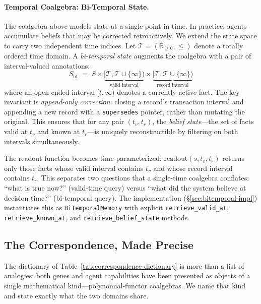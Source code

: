 \paragraph{Temporal Coalgebra: Bi-Temporal State.}
The coalgebra above models state at a single point in time. In practice, agents accumulate beliefs that may be corrected retroactively. We extend the state space to carry two independent time indices. Let $\mathcal{T} = (\mathbb{R}_{\geq 0}, \leq)$ denote a totally ordered time domain. A \emph{bi-temporal state} augments the coalgebra with a pair of interval-valued annotations:
\begin{equation}
S_{\mathrm{bt}} \;=\; S \times \underbrace{[\mathcal{T}, \mathcal{T} \cup \{\infty\})}_{\text{valid interval}} \times \underbrace{[\mathcal{T}, \mathcal{T} \cup \{\infty\})}_{\text{record interval}}
\label{eq:bitemporal-state}
\end{equation}
where an open-ended interval $[t, \infty)$ denotes a currently active fact. The key invariant is \emph{append-only correction}: closing a record's transaction interval and appending a new record with a \texttt{supersedes} pointer, rather than mutating the original. This ensures that for any pair $(t_v, t_r)$, the \emph{belief state}---the set of facts valid at $t_v$ and known at $t_r$---is uniquely reconstructible by filtering on both intervals simultaneously.

The readout function becomes time-parameterized: $\mathrm{readout}(s, t_v, t_r)$ returns only those facts whose valid interval contains $t_v$ and whose record interval contains $t_r$. This separates two questions that a single-time coalgebra conflates: ``what is true now?'' (valid-time query) versus ``what did the system believe at decision time?'' (bi-temporal query). The implementation (\S\ref{sec:bitemporal-impl}) instantiates this as \texttt{BiTemporalMemory} with explicit \texttt{retrieve\_valid\_at}, \texttt{retrieve\_known\_at}, and \texttt{retrieve\_belief\_state} methods.

\subsection{The Correspondence, Made Precise}

The dictionary of Table~\ref{tab:correspondence-dictionary} is more than a list of analogies: both genes and
agent capabilities have been presented as objects of a single mathematical kind---polynomial-functor
coalgebras. We name that kind and state exactly what the two domains share.

